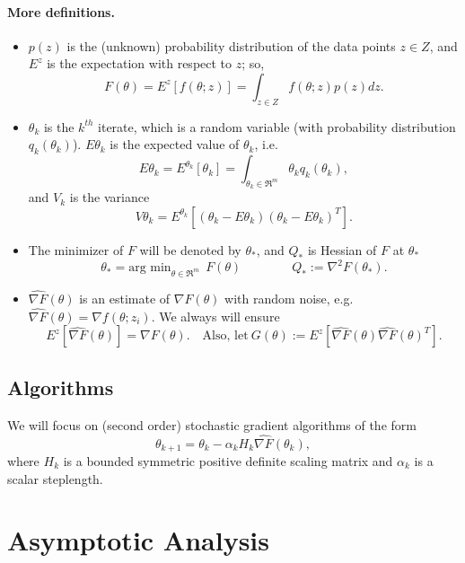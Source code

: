 \documentclass[12pt]{article}
\begin{document}
\paragraph{More definitions.}
\begin{itemize}
\item $p(z)$ is the (unknown) probability distribution of the data points $z\in Z$, and $E^z$ is the expectation with respect to $z$; so, 
\[
 F(\theta) =  E^z[f(\theta;z)] = \int_{z\in Z} f(\theta;z)p(z)dz.
\]


\item $\theta_k$ is the $k^{th}$ iterate, which is a random variable (with probability distribution $q_k(\theta_k)$).  $E\theta_k$ is the expected value of $\theta_k$, i.e. 
\[
 E\theta_k = E^{\theta_k}[\theta_k] = \int_{\theta_k\in\Re^m} \theta_kq_k(\theta_k),
\]
and $V_k$ is the variance 
\[
  V\theta_k = E^{\theta_k}[(\theta_k-E\theta_k)(\theta_k-E\theta_k)^T].
\]
\item The minimizer of $F$ will be denoted by $\theta_\ast$, and $Q_\ast$ is Hessian of $F$ at $\theta_\ast$
\[
 \theta_\ast = \mbox{arg min}_{\theta\in\Re^m} \ \ F(\theta) \qquad\qquad  Q_\ast := \nabla^2F(\theta_\ast).
\]

\item $\hat{\nabla F}(\theta)$ is an estimate of $\nabla F(\theta)$ with random noise, e.g. $\hat{\nabla F}(\theta) = \nabla f(\theta;z_i)$. We always will ensure 
\[
 E^z[\hat{\nabla F}(\theta)]=\nabla F(\theta).\quad\mbox{Also, let} \ G(\theta) := E^z[\hat{\nabla F}(\theta)\hat{\nabla F}(\theta)^T].
\]
\end{itemize}

\bigskip

\subsection{Algorithms}
We will focus on (second order) stochastic gradient algorithms of the form
\begin{equation}
 \boxed{\theta_{k+1} = \theta_k - \alpha_k H_k \hat{\nabla F}(\theta_k),}
 \label{eq:iter}
\end{equation}
where $H_k$ is a bounded symmetric positive definite scaling matrix and $\alpha_k$ is a scalar steplength.


\newpage%
\section{Asymptotic Analysis}
\end{document}
